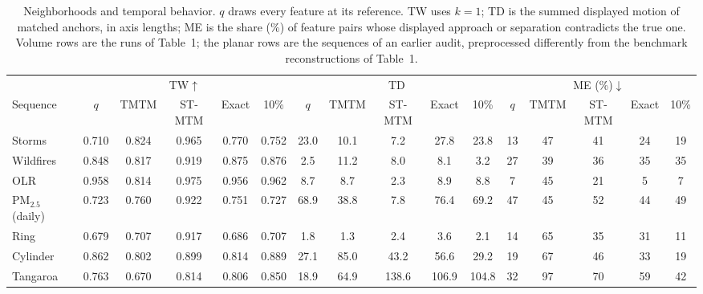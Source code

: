 \begin{table}[!htb]
\centering
\caption{Neighborhoods and temporal behavior. $q$ draws every feature at its reference. TW uses $k=1$; TD is the summed displayed motion of matched anchors, in axis lengths; ME is the share (\%) of feature pairs whose displayed approach or separation contradicts the true one. Volume rows are the runs of Table~1; the planar rows are the sequences of an earlier audit, preprocessed differently from the benchmark reconstructions of Table~1.}
\label{tab:temporal}
\footnotesize
\setlength{\tabcolsep}{2.5pt}
\begin{tabular}{@{}l ccccc ccccc ccccc@{}}
\toprule
 & \multicolumn{5}{c}{TW$\uparrow$} & \multicolumn{5}{c}{TD} & \multicolumn{5}{c}{ME (\%)$\downarrow$} \\
\cmidrule(lr){2-6}\cmidrule(lr){7-11}\cmidrule(l){12-16}
Sequence & $q$ & TMTM & ST-MTM & Exact & 10\% & $q$ & TMTM & ST-MTM & Exact & 10\% & $q$ & TMTM & ST-MTM & Exact & 10\% \\
\midrule
Storms & 0.710 & 0.824 & 0.965 & 0.770 & 0.752 & 23.0 & 10.1 & 7.2 & 27.8 & 23.8 & 13 & 47 & 41 & 24 & 19 \\
Wildfires & 0.848 & 0.817 & 0.919 & 0.875 & 0.876 & 2.5 & 11.2 & 8.0 & 8.1 & 3.2 & 27 & 39 & 36 & 35 & 35 \\
OLR & 0.958 & 0.814 & 0.975 & 0.956 & 0.962 & 8.7 & 8.7 & 2.3 & 8.9 & 8.8 & 7 & 45 & 21 & 5 & 7 \\
PM$_{2.5}$ (daily) & 0.723 & 0.760 & 0.922 & 0.751 & 0.727 & 68.9 & 38.8 & 7.8 & 76.4 & 69.2 & 47 & 45 & 52 & 44 & 49 \\
Ring & 0.679 & 0.707 & 0.917 & 0.686 & 0.707 & 1.8 & 1.3 & 2.4 & 3.6 & 2.1 & 14 & 65 & 35 & 31 & 11 \\
Cylinder & 0.862 & 0.802 & 0.899 & 0.814 & 0.889 & 27.1 & 85.0 & 43.2 & 56.6 & 29.2 & 19 & 67 & 46 & 33 & 19 \\
Tangaroa & 0.763 & 0.670 & 0.814 & 0.806 & 0.850 & 18.9 & 64.9 & 138.6 & 106.9 & 104.8 & 32 & 97 & 70 & 59 & 42 \\
\bottomrule
\end{tabular}
\end{table}
